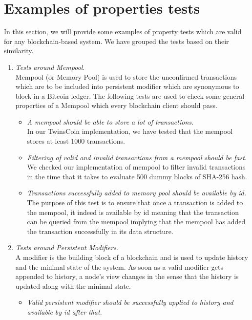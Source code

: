 
\section{Examples of properties tests}
In this section, we will provide some examples of property tests which are valid for any blockchain-based system. We have grouped the tests based on their similarity.
\begin{enumerate}[\IEEEsetlabelwidth{Z}]
\item \textit{Tests around Mempool}.\\
Mempool (or Memory Pool) is used to store the unconfirmed transactions which are to be included into persistent modifier which are synonymous to block in a Bitcoin ledger. The following tests are used to check some general properties of a Mempool which every blockchain client should pass.
\begin{itemize}[]
\item \textit{A mempool should be able to store a lot of transactions.}\\
In our TwinsCoin implementation, we have tested that the mempool stores at least 1000 transactions.
\item \textit{Filtering of valid and invalid transactions from a mempool should be fast}.\\
We checked our implementation of mempool to filter invalid transactions in the time that it takes to evaluate 500 dummy blocks of SHA-256 hash.
\item \textit{Transactions successfully added to memory pool should be available by id.}\\
The purpose of this test is to ensure that once a transaction is added to the mempool, it indeed is available by id meaning that the transaction can be queried from the mempool implying that the mempool has added the transaction successfully in its data structure.
\end{itemize}
\item \textit{Tests around Persistent Modifiers}.\\
A modifier is the building block of a blockchain and is used to update history and the minimal state of the system. As soon as a valid modifier gets appended to history, a node's view changes in the sense that the history is updated along with the minimal state.
\begin{itemize}[]
\item \textit{Valid persistent modifier should be successfully applied to history and available by id after that}.\\

\end{itemize}
\end{enumerate}
